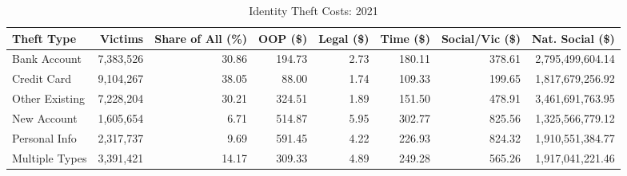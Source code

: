 \documentclass{article}
\begin{document}
\begin{table}[ht]
    \centering
    \caption{Identity Theft Costs: 2021}
    \scriptsize
    \begin{tabularx}{\textwidth}{X r r r r r r r}
        \toprule
        \textbf{Theft Type} & \textbf{Victims} & \textbf{Share of All (\%)} & \textbf{OOP (\$)} & \textbf{Legal (\$)} & \textbf{Time (\$)} & \textbf{Social/Vic (\$)} & \textbf{Nat. Social (\$)} \\ \midrule
        Bank Account & 7,383,526 & 30.86 & 194.73 & 2.73 & 180.11 & 378.61 & 2,795,499,604.14 \\
        Credit Card & 9,104,267 & 38.05 & 88.00 & 1.74 & 109.33 & 199.65 & 1,817,679,256.92 \\
        Other Existing & 7,228,204 & 30.21 & 324.51 & 1.89 & 151.50 & 478.91 & 3,461,691,763.95 \\
        New Account & 1,605,654 & 6.71 & 514.87 & 5.95 & 302.77 & 825.56 & 1,325,566,779.12 \\
        Personal Info & 2,317,737 & 9.69 & 591.45 & 4.22 & 226.93 & 824.32 & 1,910,551,384.77 \\
        Multiple Types & 3,391,421 & 14.17 & 309.33 & 4.89 & 249.28 & 565.26 & 1,917,041,221.46 \\
        \bottomrule
    \end{tabularx}
\end{table}
\end{document}
